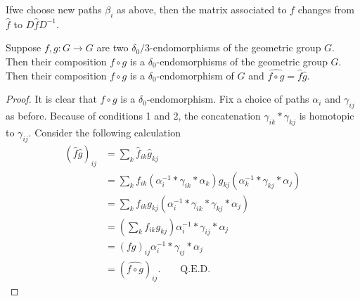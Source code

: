 \begin{figure}[H]
\end{figure}
 
\begin{lemma}\label{c9:lem9.2}
  If\pageoriginale we choose new paths $\beta_i$ as above, then the matrix
  associated to $f$ changes from $\hat{f}$ to $D\hat{f} D^{-1}$.
\end{lemma}

\begin{lemma}\label{c9:lem9.3}
  Suppose $f, g: G \to G$ are two $\delta_0/3$-endomorphisms of the
  geometric group $G$. Then their composition $f \circ g$ is a
  $\delta_0$-endomorphisms of the geometric group $G$. Then their
  composition $f \circ g$ is a $\delta_0$-endomor\-phism of $G$ and
  $\widehat{f \circ g}= \hat{f} \hat{g}$. 
\end{lemma}

\begin{proof}
  It is clear that $f \circ g$ is a $\delta_0$-endomorphism. Fix a
  choice of paths $\alpha_i$ and $\gamma_{ij}$ as before. Because of
  conditions 1 and 2, the concatenation $\gamma_{ik}* \gamma_{kj}$ is
  homotopic to $\gamma_{ij}$. Consider the following calculation
  \begin{align*}
    (\hat{f} \hat{g})_{ij} & = \sum_k \hat{f}_{ik} \hat{g}_{kj}\\
    & = \sum_k f_{ik} (\alpha_i^{-1} * \gamma_{ik} * \alpha_k) g_{kj}
    (\alpha_k ^{-1} * \gamma_{kj} * \alpha_j)\\
    & = \sum_k f_{ik} g_{kj} (\alpha_i^{-1} * \gamma_{ik} * \gamma_{kj}
      * \alpha_j)\\
      & = \left(\sum_k f_{ik} g_{kj} \right) \alpha_i^{-1} *
      \gamma_{ij} * \alpha_j\\
      & = (fg)_{ij} \alpha_i^{-1} * \gamma_{ij} * \alpha_j\\
      & = (\widehat{f \circ g})_{ij}. \qquad \text{Q.E.D.}
  \end{align*}
\end{proof}

